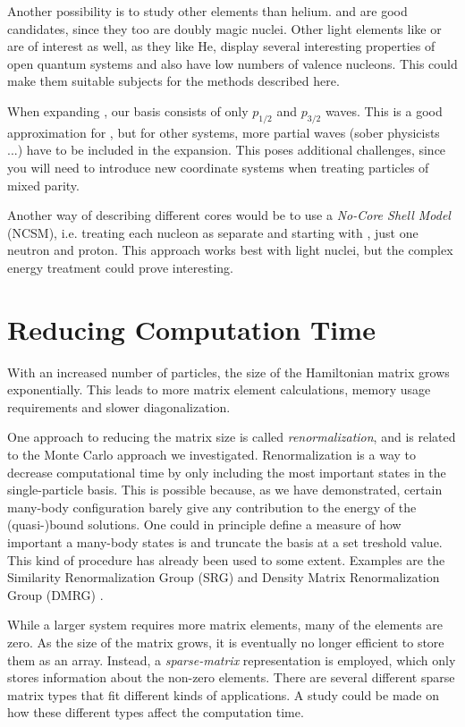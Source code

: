 \documentclass[../main/report.tex]{subfiles}
\begin{document}
Another possibility is to study other elements than helium.  and  are good candidates, since they too are doubly magic nuclei.
Other light elements like  or  are of interest as well, as they like He, display several interesting properties of open quantum systems and also have low numbers of valence nucleons. 
This could make them suitable subjects for the methods described here.

When expanding , our basis consists of only $p_{1/2}$ and $p_{3/2}$ waves. 
This is a good approximation for  \cite{gamow_shell_model_2008},  but for other systems, more partial waves (sober physicists ...) have to be included in the expansion. 
This poses additional challenges, since you will need to introduce new coordinate systems when treating particles of mixed parity. 

Another way of describing different cores would be to use a \emph{No-Core Shell Model} (NCSM), i.e. treating each nucleon as separate and starting with , just one neutron and proton. 
This approach works best with light nuclei, but the complex energy treatment could prove interesting.

\section{Reducing Computation Time}
With an increased number of particles, the size of the Hamiltonian matrix grows exponentially. This leads to more matrix element calculations, memory usage requirements and slower diagonalization.

One approach to reducing the matrix size is called \emph{renormalization}, and is related to the Monte Carlo approach we investigated. 
Renormalization is a way to decrease computational time by only including the most important states in the single-particle basis.
This is possible because, as we have demonstrated, certain many-body configuration barely give any contribution to the energy of the (quasi-)bound solutions. 
One could in principle define a  measure of how important a many-body states is and truncate the basis at a set treshold value. 
This kind of procedure has already been used to some extent. 
Examples are the Similarity Renormalization Group (SRG) and Density Matrix Renormalization Group (DMRG) \cite{DMRG}. 


While a larger system requires more matrix elements, many of the elements are zero. 
As the size of the matrix grows, it is eventually no longer efficient to store them as an array. 
Instead, a \emph{sparse-matrix} representation is employed, which only stores information about the non-zero elements. 
There are several different sparse matrix types that fit different kinds of applications.
A study could be made on how these different types affect the computation time.
\end{document}
